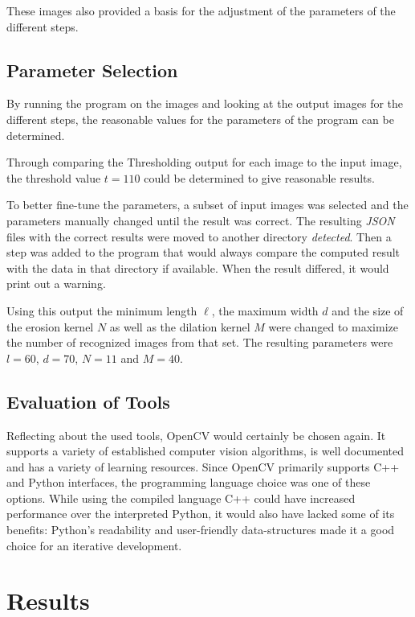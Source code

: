 \documentclass[serif,article,noparskip]{agse-thesis}
\begin{document}
These images also provided a basis for the adjustment of the parameters of the
different steps.

\subsection{Parameter Selection} \label{parameter}

By running the program on the images and looking at the output images for the
different steps, the reasonable values for the parameters of the program can be
determined.

Through comparing the Thresholding output for each image to the input image, the
threshold value $t = 110$ could be determined to give reasonable results.

To better fine-tune the parameters, a subset of input images was selected and
the parameters manually changed until the result was correct. The resulting
\textit{JSON} files with the correct results were moved to another directory
\textit{detected}. Then a step was added to the program that would always
compare the computed result with the data in that directory if available. When
the result differed, it would print out a warning.

Using this output the minimum length $\ell$, the maximum width $d$ and the size
of the erosion kernel $N$ as well as the dilation kernel $M$ were changed to
maximize the number of recognized images from that set. The resulting parameters
were $l = 60$, $d = 70$, $N=11$ and $M =40$.

\subsection{Evaluation of Tools} \label{evaluation}

Reflecting about the used tools, OpenCV would certainly be chosen again. It
supports a variety of established computer vision algorithms, is well documented
and has a variety of learning resources. Since OpenCV primarily supports C++ and
Python interfaces, the programming language choice was one of these options.
While using the compiled language C++ could have increased performance over the
interpreted Python, it would also have lacked some of its benefits: Python's
readability and user-friendly data-structures made it a good choice for an
iterative development.

\section{Results} \label{results}
\end{document}
